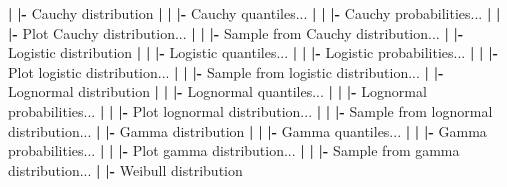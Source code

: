 \documentclass[12pt,]{krantz}
\newenvironment{Shaded}{\begin{snugshade}}{\end{snugshade}}
\newcommand{\ErrorTok}[1]{\textcolor[rgb]{0.64,0.00,0.00}{\textbf{#1}}}
\newcommand{\NormalTok}[1]{#1}
\newcommand{\OperatorTok}[1]{\textcolor[rgb]{0.81,0.36,0.00}{\textbf{#1}}}
\newcommand{\StringTok}[1]{\textcolor[rgb]{0.31,0.60,0.02}{#1}}
\begin{document}
\begin{Shaded}
\begin{Highlighting}[]
  \OperatorTok{|}\StringTok{ }\ErrorTok{|}\OperatorTok{-}\StringTok{ }\NormalTok{Cauchy distribution}
  \OperatorTok{|}\StringTok{ }\ErrorTok{|}\StringTok{ }\ErrorTok{|}\OperatorTok{-}\StringTok{ }\NormalTok{Cauchy quantiles...}
  \OperatorTok{|}\StringTok{ }\ErrorTok{|}\StringTok{ }\ErrorTok{|}\OperatorTok{-}\StringTok{ }\NormalTok{Cauchy probabilities...}
  \OperatorTok{|}\StringTok{ }\ErrorTok{|}\StringTok{ }\ErrorTok{|}\OperatorTok{-}\StringTok{ }\NormalTok{Plot Cauchy distribution...}
  \OperatorTok{|}\StringTok{ }\ErrorTok{|}\StringTok{ }\ErrorTok{|}\OperatorTok{-}\StringTok{ }\NormalTok{Sample from Cauchy distribution...}
  \OperatorTok{|}\StringTok{ }\ErrorTok{|}\OperatorTok{-}\StringTok{ }\NormalTok{Logistic distribution}
  \OperatorTok{|}\StringTok{ }\ErrorTok{|}\StringTok{ }\ErrorTok{|}\OperatorTok{-}\StringTok{ }\NormalTok{Logistic quantiles...}
  \OperatorTok{|}\StringTok{ }\ErrorTok{|}\StringTok{ }\ErrorTok{|}\OperatorTok{-}\StringTok{ }\NormalTok{Logistic probabilities...}
  \OperatorTok{|}\StringTok{ }\ErrorTok{|}\StringTok{ }\ErrorTok{|}\OperatorTok{-}\StringTok{ }\NormalTok{Plot logistic distribution...}
  \OperatorTok{|}\StringTok{ }\ErrorTok{|}\StringTok{ }\ErrorTok{|}\OperatorTok{-}\StringTok{ }\NormalTok{Sample from logistic distribution...}
  \OperatorTok{|}\StringTok{ }\ErrorTok{|}\OperatorTok{-}\StringTok{ }\NormalTok{Lognormal distribution}
  \OperatorTok{|}\StringTok{ }\ErrorTok{|}\StringTok{ }\ErrorTok{|}\OperatorTok{-}\StringTok{ }\NormalTok{Lognormal quantiles...}
  \OperatorTok{|}\StringTok{ }\ErrorTok{|}\StringTok{ }\ErrorTok{|}\OperatorTok{-}\StringTok{ }\NormalTok{Lognormal probabilities...}
  \OperatorTok{|}\StringTok{ }\ErrorTok{|}\StringTok{ }\ErrorTok{|}\OperatorTok{-}\StringTok{ }\NormalTok{Plot lognormal distribution...}
  \OperatorTok{|}\StringTok{ }\ErrorTok{|}\StringTok{ }\ErrorTok{|}\OperatorTok{-}\StringTok{ }\NormalTok{Sample from lognormal distribution...}
  \OperatorTok{|}\StringTok{ }\ErrorTok{|}\OperatorTok{-}\StringTok{ }\NormalTok{Gamma distribution}
  \OperatorTok{|}\StringTok{ }\ErrorTok{|}\StringTok{ }\ErrorTok{|}\OperatorTok{-}\StringTok{ }\NormalTok{Gamma quantiles...}
  \OperatorTok{|}\StringTok{ }\ErrorTok{|}\StringTok{ }\ErrorTok{|}\OperatorTok{-}\StringTok{ }\NormalTok{Gamma probabilities...}
  \OperatorTok{|}\StringTok{ }\ErrorTok{|}\StringTok{ }\ErrorTok{|}\OperatorTok{-}\StringTok{ }\NormalTok{Plot gamma distribution...}
  \OperatorTok{|}\StringTok{ }\ErrorTok{|}\StringTok{ }\ErrorTok{|}\OperatorTok{-}\StringTok{ }\NormalTok{Sample from gamma distribution...}
  \OperatorTok{|}\StringTok{ }\ErrorTok{|}\OperatorTok{-}\StringTok{ }\NormalTok{Weibull distribution}

\end{Highlighting}
\end{Shaded}
\end{document}
